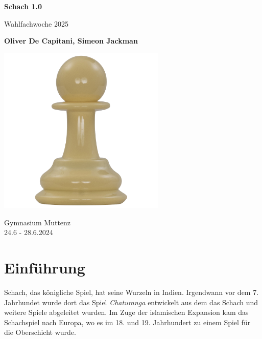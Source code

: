 \documentclass{article}
\begin{document}
\begin{titlepage}
    \begin{center}
        \vspace*{1cm}
 
        \Huge
        \textbf{Schach 1.0}
 
        \vspace{0.5cm}
        \LARGE
        Wahlfachwoche 2025
 
        \vspace{1.5cm}
 
        \textbf{Oliver De Capitani, Simeon Jackman}
 
        \vfill
 
 
 
        \includegraphics[width=0.6\textwidth]{pawn}
		\vfill
        
               \Large
        Gymnasium Muttenz \\
        24.6 - 28.6.2024
         
    \end{center}
\end{titlepage}

\tableofcontents

\newpage


\section{Einführung}
Schach, das königliche Spiel, hat seine Wurzeln in Indien. Irgendwann vor dem 7. Jahrhundet wurde dort das Spiel \emph{Chaturanga} entwickelt aus dem das Schach und weitere Spiele abgeleitet wurden. Im Zuge der islamischen Expansion kam das Schachspiel nach Europa, wo es im 18. und 19. Jahrhundert zu einem Spiel für die Oberschicht wurde. 
\end{document}
